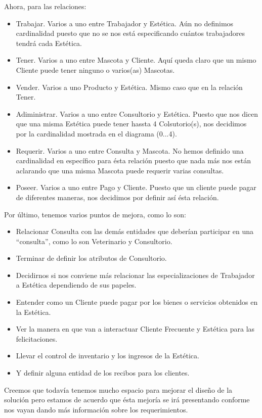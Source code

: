 \documentclass{article}
\begin{document}
Ahora, para las relaciones:
\begin{itemize}
    \item Trabajar. Varios a uno entre Trabajador y Estética. Aún no definimos cardinalidad puesto que no se nos está especificando 
    cuántos trabajadores tendrá cada Estética.
    \item Tener. Varios a uno entre Mascota y Cliente. Aquí queda claro que un mismo Cliente puede tener 
    ninguno o varios(as) Mascotas.
    \item Vender. Varios a uno Producto y Estética. Mismo caso que en la relación Tener.
    \item Adiministrar. Varios a uno entre Consultorio y Estética. Puesto que nos dicen que una misma Estética puede tener hassta 4 Colsutorio(s),
    nos decidimos por la cardinalidad mostrada en el diagrama (0...4).
    \item Requerir. Varios a uno entre Consulta y Mascota. No hemos definido una cardinalidad en específico para ésta relación puesto que 
    nada más nos están aclarando que una misma Mascota puede requerir varias consultas.
    \item Poseer. Varios a uno entre Pago y Cliente. Puesto que un cliente puede pagar de diferentes maneras, nos decidimos por definir así 
    ésta relación.
\end{itemize}


Por último, tenemos varios puntos de mejora, como lo son:
\begin{itemize}
    \item Relacionar Consulta con las demás entidades que deberían participar en una ``consulta'', como lo son Veterinario y Consultorio.
    \item Terminar de definir los atributos de Consultorio.
    \item Decidirnos si nos conviene más relacionar las especializaciones de Trabajador a Estética dependiendo de sus papeles.
    \item Entender como un Cliente puede pagar por los bienes o servicios obtenidos en la Estética.
    \item Ver la manera en que van a interactuar Cliente Frecuente y Estética para las felicitaciones.
    \item Llevar el control de inventario y los ingresos de la Estética.
    \item Y definir alguna entidad de los recibos para los clientes.
\end{itemize}

Creemos que todavía tenemos mucho espacio para mejorar el diseño de la solución pero estamos de acuerdo que ésta mejoría se irá presentando 
conforme nos vayan dando más información sobre los requerimientos.
\end{document}
